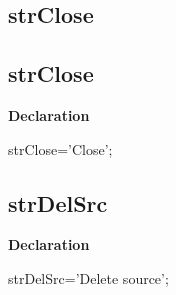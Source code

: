 \documentclass{report}
\newif\ifpdf
\begin{document}
\subsection*{\large{\textbf{strClose}}\normalsize\hspace{1ex}\hrulefill}
\else
\subsection*{strClose}
\fi
\label{trstrings-strClose}
\begin{list}{}{
\setlength{\itemindent}{0cm}
\setlength{\listparindent}{0cm}
\setlength{\leftmargin}{\evensidemargin}
\addtolength{\leftmargin}{\tmplength}
\settowidth{\labelsep}{X}
\addtolength{\leftmargin}{\labelsep}
\setlength{\labelwidth}{\tmplength}
}
\item[\textbf{Declaration}\hfill]
\ifpdf
\begin{flushleft}
\fi
\begin{ttfamily}
strClose='Close';\end{ttfamily}

\ifpdf
\end{flushleft}
\fi

\end{list}
\ifpdf
\subsection*{\large{\textbf{strDelSrc}}\normalsize\hspace{1ex}\hrulefill}
\else
\subsection*{strDelSrc}
\fi
\label{trstrings-strDelSrc}
\begin{list}{}{
\setlength{\itemindent}{0cm}
\setlength{\listparindent}{0cm}
\setlength{\leftmargin}{\evensidemargin}
\addtolength{\leftmargin}{\tmplength}
\settowidth{\labelsep}{X}
\addtolength{\leftmargin}{\labelsep}
\setlength{\labelwidth}{\tmplength}
}
\item[\textbf{Declaration}\hfill]
\ifpdf
\begin{flushleft}
\fi
\begin{ttfamily}
strDelSrc='Delete source';\end{ttfamily}

\ifpdf
\end{flushleft}
\fi

\end{list}
\ifpdf
\end{document}
